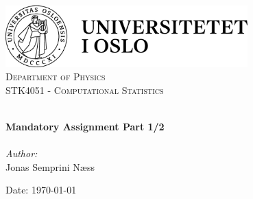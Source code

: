 
\begin{titlepage}
\vbox{ }
\vbox{ }
\begin{center}
\includegraphics[width=0.70\textwidth]{Images/01_uio_full_logo_no_pos}\\[1cm]
\textsc{\LARGE Department of Physics}\\[1.5cm]
\textsc{\Large STK4051 - Computational Statistics}\\[0.5cm]
\vbox{ }

\HRule \\[0.4cm]
{ \huge \bfseries Mandatory Assignment Part 1/2}\\[0.4cm]
\HRule \\[1.5cm]

\large
\emph{Author:}\\
Jonas Semprini Næss
\vfill

{\large Date: \today}
\end{center}
\end{titlepage}